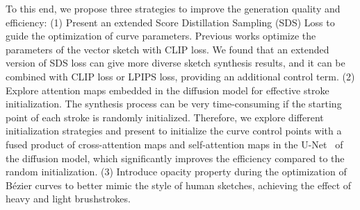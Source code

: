 \documentclass{article}
\begin{document}
To this end, we propose three strategies to improve the generation quality and efficiency: 
(1) Present an extended Score Distillation Sampling (SDS) Loss to guide the optimization of curve parameters.
Previous works optimize the parameters of the vector sketch with CLIP loss. We found that an extended version of SDS loss can give more diverse sketch synthesis results, and it can be combined with  CLIP loss or LPIPS loss,  providing an additional control term.
(2) Explore attention maps embedded in the diffusion model for effective stroke initialization.
The synthesis process can be very time-consuming if the starting point of each stroke is randomly initialized. Therefore, we explore different initialization strategies and present to initialize the curve control points with a fused product of cross-attention maps and self-attention maps in the U-Net~\cite{Dhariwal_ADM_2021} of the diffusion model,
which significantly improves the efficiency compared to the random initialization. 
(3) Introduce opacity property during the optimization of Bézier curves to better mimic the style of human sketches, achieving the effect of heavy and light brushstrokes.
\end{document}
